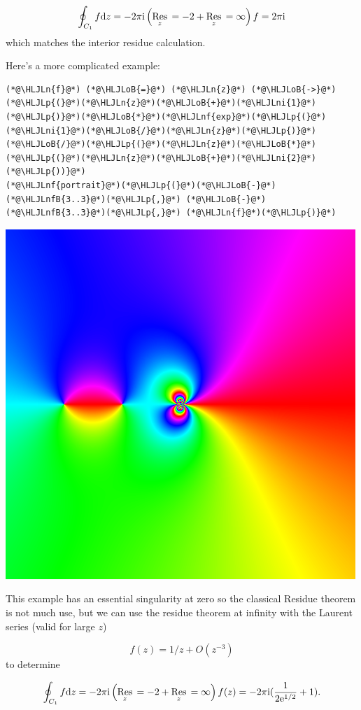 \documentclass[12pt,a4paper]{article}
\newcommand{\HLJLn}[1]{#1}
\newcommand{\HLJLnf}[1]{\textcolor[RGB]{66,102,213}{#1}}
\newcommand{\HLJLnfB}[1]{\textcolor[RGB]{59,151,46}{#1}}
\newcommand{\HLJLni}[1]{\textcolor[RGB]{59,151,46}{#1}}
\newcommand{\HLJLoB}[1]{\textcolor[RGB]{102,102,102}{\textbf{#1}}}
\newcommand{\HLJLp}[1]{#1}
\def\D{ {\rm d} }
\def\I{ {\rm i} }
\def\E{ {\rm e} }
\def\Res_#1{\underset{#1}{\rm Res}\,}
\def\pr(#1){\left({#1}\right)}
\begin{document}
\[
\oint_{C_1} f \D z =  -2 \pi \I \pr(\Res_{z = -2} + \Res_{z = \infty}) f = 2\pi \I 
\]
which matches the interior residue calculation.

Here's a more complicated example:


\begin{lstlisting}
(*@\HLJLn{f}@*) (*@\HLJLoB{=}@*) (*@\HLJLn{z}@*) (*@\HLJLoB{->}@*) (*@\HLJLp{(}@*)(*@\HLJLn{z}@*)(*@\HLJLoB{+}@*)(*@\HLJLni{1}@*)(*@\HLJLp{)}@*)(*@\HLJLoB{*}@*)(*@\HLJLnf{exp}@*)(*@\HLJLp{(}@*)(*@\HLJLni{1}@*)(*@\HLJLoB{/}@*)(*@\HLJLn{z}@*)(*@\HLJLp{)}@*)(*@\HLJLoB{/}@*)(*@\HLJLp{(}@*)(*@\HLJLn{z}@*)(*@\HLJLoB{*}@*)(*@\HLJLp{(}@*)(*@\HLJLn{z}@*)(*@\HLJLoB{+}@*)(*@\HLJLni{2}@*)(*@\HLJLp{))}@*)
(*@\HLJLnf{portrait}@*)(*@\HLJLp{(}@*)(*@\HLJLoB{-}@*)(*@\HLJLnfB{3..3}@*)(*@\HLJLp{,}@*) (*@\HLJLoB{-}@*)(*@\HLJLnfB{3..3}@*)(*@\HLJLp{,}@*) (*@\HLJLn{f}@*)(*@\HLJLp{)}@*)
\end{lstlisting}

\includegraphics[width=\linewidth]{figures/Lecture4_7_1.png}

This example has an essential singularity at zero so the classical Residue theorem is not much use,  but we can use the residue theorem at infinity with the Laurent series (valid for large $z$)

\[
f(z) = 1/z + O(z^{-3})
\]
to determine

\[
\oint_{C_1} f \D z = - 2\pi \I \pr(\Res_{z=-2} + \Res_{z = \infty}) f(z) = -2 \pi \I ({1 \over 2 \E^{1/2}} + 1).
\]
\end{document}
